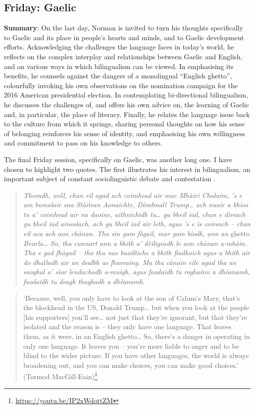 \documentclass[output=paper,colorlinks,citecolor=brown]{langscibook}
\begin{document}
\subsection{Friday: Gaelic}

\textbf{Summary}: On the last day, Norman is invited to turn his thoughts specifically to Gaelic and its place in people’s hearts and minds, and to Gaelic development efforts. Acknowledging the challenges the language faces in today’s world, he reflects on the complex interplay and relationships between Gaelic and English, and on various ways in which bilingualism can be viewed. In emphasising its benefits, he counsels against the dangers of a monolingual ``English ghetto”, colourfully invoking his own observations on the nomination campaign for the 2016 American presidential election. In contemplating bi-directional bilingualism, he discusses the challenges of, and offers his own advice on, the learning of Gaelic and, in particular, the place of literacy. Finally, he relates the language issue back to the culture from which it springs, sharing personal thoughts on how his sense of belonging reinforces his sense of identity, and emphasising his own willingness and commitment to pass on his knowledge to others.

The final Friday session, specifically on Gaelic, was another long one. I have chosen to highlight two quotes. The first illustrates his interest in bilingualism, an important subject of constant sociolinguistic debate and contestation \citep{Jaspers2016}.

\begin{quote}
\textit{Thoradh, well, chan eil agad ach coimhead air mac Mhàiri Chaluim, ’s e am bumalair sna Stàitean Aonaichte, Dòmhnall Trump… ach nuair a bhios tu a’ coimhead air na daoine, aithnichidh tu… gu bheil iad, chan e dìreach gu bheil iad aineolach, ach gu bheil iad air leth, agus ’s e is coireach – chan eil aca ach aon chànan. Tha sin gam fàgail, mar gum biodh, ann an} ghetto \textit{Beurla… So, tha cunnart ann a bhith a’ dèiligeadh le aon chànan a-mhàin. Tha e gad fhàgail – tha thu nas buailtiche a bhith fiadhaich agus a bhith air do dhalladh air an dealbh as fharsaing. Ma tha cànain eile agad tha an saoghal a’ sìor leudachadh a-muigh, agus faodaidh tu roghainn a dhèanamh, faodaidh tu deagh thaghadh a dhèanamh.}
\end{quote}

\begin{quote}
`Because, well, you only have to look at the son of Calum’s Mary, that’s the blockhead in the US, Donald Trump… but when you look at the people [his supporters] you’ll see… not just that they’re ignorant, but that they’re isolated and the reason is – they only have one language. That leaves them, as it were, in an English ghetto… So, there’s a danger in operating in only one language. It leaves you – you’re more liable to anger and to be blind to the wider picture. If you have other languages, the world is always broadening out, and you can make choices, you can make good choices.' (Tormod MacGill-Eain)\footnote{\url{https://youtu.be/IP2xWdottZM}} 
\end{quote}
\end{document}
